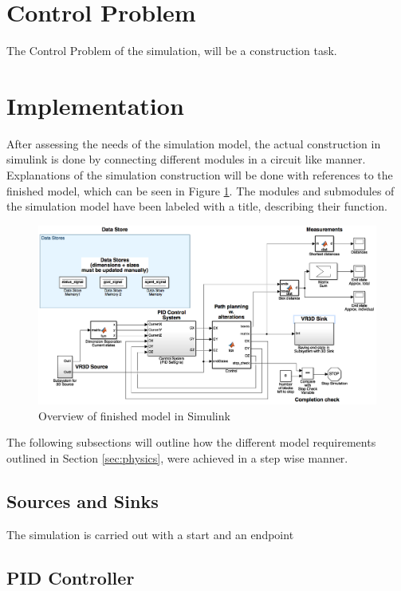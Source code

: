 \section{Control Problem}
\label{sec:control_problem}
The Control Problem of the simulation, will be a construction task. 

\section{Implementation}
\label{sec:construction}

After assessing the needs of the simulation model, the actual construction in simulink is done by connecting different modules in a circuit like manner. Explanations of the simulation construction will be done with references to the finished model, which can be seen in Figure \ref{fig:model_overview}. The modules and submodules of the simulation model have been labeled with a title, describing their function. 

\begin{figure}[H]
  \centering
  \includegraphics[width=1\columnwidth]{figures/model_overview}
  \caption{\label{fig:model_overview}Overview of finished model in Simulink}
\end{figure}

The following subsections will outline how the different model requirements outlined in Section \ref{sec:physics}, were achieved in a step wise manner.

\subsection{Sources and Sinks}
The simulation is carried out with a start and an endpoint 

\subsection{PID Controller}
\label{sec:sim_pid}

